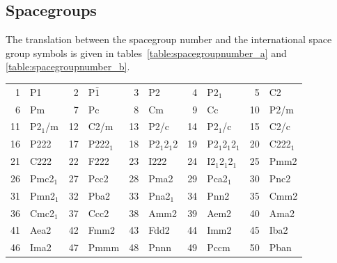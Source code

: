 \documentclass[final,12pt]{article}
\begin{document}
{{{{{{%
\newpage
\subsection{Spacegroups}
The translation between the spacegroup number and the international
space group symbols is given in tables~\ref{table:spacegroupnumber_a}
and \ref{table:spacegroupnumber_b}.
\begin{table}[h!]
\begin{center}
\begin{tabular}{||r|l||r|l||r|l||r|l||r|l||}
\hline
1      & P1                 & 
2      & P$\bar{1}$         & 
3      & P2                 & 
4      & P2$_1$             & 
5      & C2                 \\
6      & Pm                 & 
7      & Pc                 & 
8      & Cm                 & 
9      & Cc                 & 
10     & P2/m               \\
11     & P2$_1$/m           & 
12     & C2/m               & 
13     & P2/c               & 
14     & P2$_1$/c           & 
15     & C2/c               \\
16     & P222               & 
17     & P222$_1$           & 
18     & P2$_1$2$_1$2       & 
19     & P2$_1$2$_1$2$_1$   & 
20     & C222$_1$           \\
21     & C222               & 
22     & F222               & 
23     & I222               & 
24     & I2$_1$2$_1$2$_1$   & 
25     & Pmm2               \\
26     & Pmc2$_1$           & 
27     & Pcc2               & 
28     & Pma2               & 
29     & Pca2$_1$           & 
30     & Pnc2               \\
31     & Pmn2$_1$           & 
32     & Pba2               & 
33     & Pna2$_1$           & 
34     & Pnn2               & 
35     & Cmm2               \\
36     & Cmc2$_1$           & 
37     & Ccc2               & 
38     & Amm2               & 
39     & Aem2               & 
40     & Ama2               \\
41     & Aea2               & 
42     & Fmm2               & 
43     & Fdd2               & 
44     & Imm2               & 
45     & Iba2               \\
46     & Ima2               & 
47     & Pmmm               & 
48     & Pnnn               & 
49     & Pccm               & 
50     & Pban               \\

\end{tabular}
\end{center}
\end{table}}}}}}}
\end{document}
